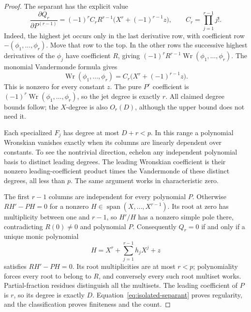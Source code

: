 \begin{proof}
The separant has the explicit value
\begin{equation}
 \frac{\partial Q_r}{\partial P^{(r-1)}}
 =(-1)^r C_r R^{r-1}\bigl(X^r+(-1)^{r-1}z\bigr),
 \qquad C_r=\prod_{j=1}^{r-1}j!.
 \label{eq:isolated-separant}
\end{equation}
Indeed, the highest jet occurs only in the last derivative row, with
coefficient row $-(\phi_1,\ldots,\phi_r)$. Move that row to the top.
In the other rows the successive highest derivatives of the $\phi_j$
have coefficient $R$, giving $(-1)^rR^{r-1}\operatorname{Wr}(\phi_1,\ldots,\phi_r)$.
The monomial Vandermonde formula gives
\[
 \operatorname{Wr}(\phi_1,\ldots,\phi_r)
   =C_r\bigl(X^r+(-1)^{r-1}z\bigr).
\]
This is nonzero for every constant $z$. The pure $P^r$ coefficient
is $(-1)^r\operatorname{Wr}(\phi_1,\ldots,\phi_r)$, so the jet
degree is exactly $r$. All claimed degree bounds follow; the
$X$-degree is also $O_r(D)$, although the upper bound does not need it.

Each specialized $F_j$ has degree at most $D+r<p$. In this range a
polynomial Wronskian vanishes exactly when its columns are linearly
dependent over constants. To see the nontrivial direction, echelon
any independent polynomial basis to distinct leading degrees. The
leading Wronskian coefficient is their nonzero leading-coefficient
product times the Vandermonde of these distinct degrees, all less
than $p$. The same argument works in characteristic zero.

The first $r-1$ columns are independent for every polynomial $P$.
Otherwise $RH'-PH=0$ for a nonzero
$H\in\operatorname{span}(X,\ldots,X^{r-1})$. Its root at zero has
multiplicity between one and $r-1$, so $H'/H$ has a nonzero simple
pole there, contradicting $R(0)\ne0$ and polynomial $P$.
Consequently $Q_r=0$ if and only if a unique monic polynomial
\[
 H=X^r+\sum_{j=1}^{r-1}h_jX^j+z
\]
satisfies $RH'-PH=0$. Its root multiplicities are at most $r<p$;
polynomiality forces every root to belong to $R$, and conversely
every such root multiset works. Partial-fraction residues distinguish
all the multisets. The leading coefficient of $P$ is $r$, so its
degree is exactly $D$. Equation~\eqref{eq:isolated-separant} proves
regularity, and the classification proves finiteness and the count.


\end{proof}
